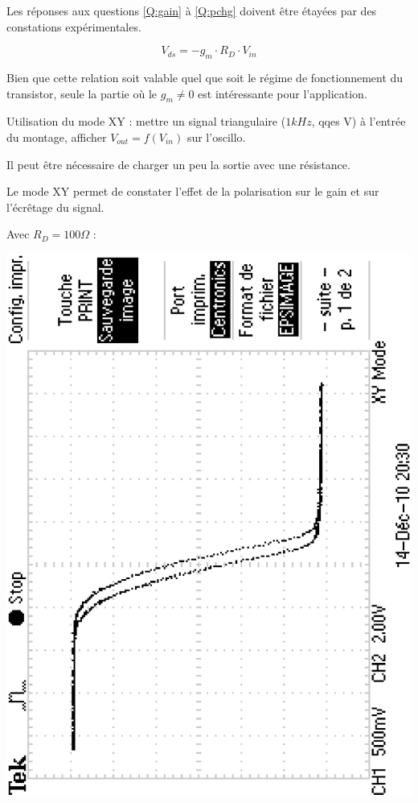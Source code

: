 \documentclass{../template/tp}
\begin{document}
Les réponses aux questions \ref{Q:gain} à \ref{Q:pchg} doivent être étayées par des constations expérimentales.

{
$$V_{ds}=-g_m\cdot R_D \cdot V_{in}$$

Bien que cette relation soit valable quel que soit le régime de fonctionnement du transistor, seule la partie où le $g_m\neq 0$ est intéressante pour l'application.

Utilisation du mode XY :
mettre un signal triangulaire ($1kHz$, qqes V) à l'entrée du montage, afficher $V_{out}=f(V_{in})$ sur l'oscillo.

 Il peut être nécessaire de charger un peu la sortie avec une résistance.

Le mode XY permet de constater l'effet de la polarisation sur le gain et sur l'écrêtage du signal.

Avec $R_D=100\Omega$ :
\begin{center}
\includegraphics[angle=270, width=10 cm]{mesures/tek0004.eps}

\end{center}
}
\end{document}
